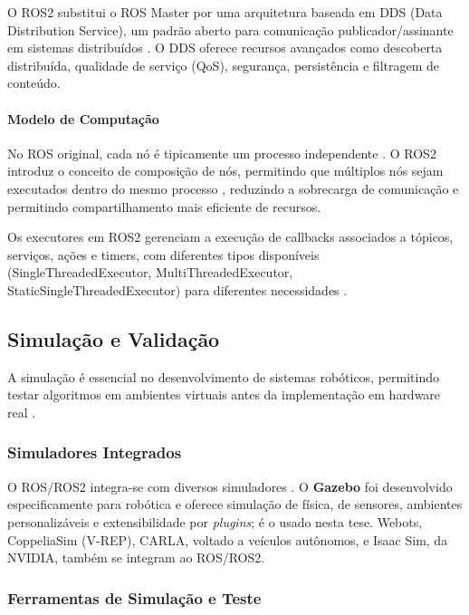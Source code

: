 O ROS2 substitui o ROS Master por uma arquitetura baseada em DDS (Data Distribution Service), um padrão aberto para comunicação publicador/assinante em sistemas distribuídos \cite{Macenski2022, ROS2Design2024}. O DDS oferece recursos avançados como descoberta distribuída, qualidade de serviço (QoS), segurança, persistência e filtragem de conteúdo.

\paragraph{Modelo de Computação}

No ROS original, cada nó é tipicamente um processo independente \cite{Quigley2009, Joseph2018}. O ROS2 introduz o conceito de composição de nós, permitindo que múltiplos nós sejam executados dentro do mesmo processo \cite{Macenski2022, ROS2Design2024}, reduzindo a sobrecarga de comunicação e permitindo compartilhamento mais eficiente de recursos.

Os executores em ROS2 gerenciam a execução de callbacks associados a tópicos, serviços, ações e timers, com diferentes tipos disponíveis (SingleThreadedExecutor, MultiThreadedExecutor, StaticSingleThreadedExecutor) para diferentes necessidades \cite{Macenski2022, ROS2Design2024}.

\subsection{Simulação e Validação}

A simulação é essencial no desenvolvimento de sistemas robóticos, permitindo testar algoritmos em ambientes virtuais antes da implementação em hardware real \cite{Siegwart2011}.

\subsubsection{Simuladores Integrados}

O ROS/ROS2 integra-se com diversos simuladores \cite{Joseph2018, Macenski2022}. O
\textbf{Gazebo} foi desenvolvido especificamente para robótica e oferece simulação de
física, de sensores, ambientes personalizáveis e extensibilidade por \textit{plugins}; é
o usado nesta tese. Webots, CoppeliaSim (V-REP), CARLA, voltado a veículos autônomos, e
Isaac Sim, da NVIDIA, também se integram ao ROS/ROS2.

\subsubsection{Ferramentas de Simulação e Teste}

